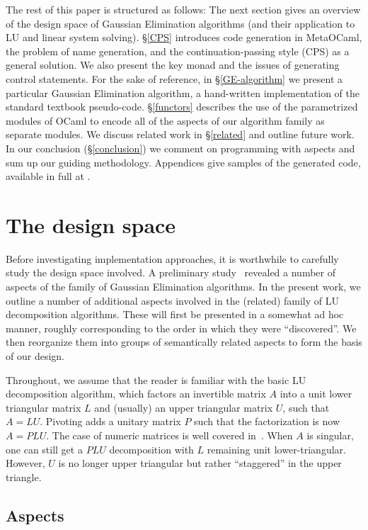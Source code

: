 \documentclass{elsart}
\begin{document}
The rest of this paper is structured as follows: The next section
gives an overview of the design space of Gaussian Elimination algorithms
(and their application to LU and linear system solving).
\S\ref{CPS}
introduces code generation in MetaOCaml, the problem of name
generation, and the continuation-passing style (CPS) as a general
solution.  We also present the key monad and the issues of generating
control statements. For the sake of reference, in \S\ref{GE-algorithm} 
we present a particular Gaussian Elimination algorithm,
a hand-written implementation of the standard textbook pseudo-code.
\S\ref{functors} describes the use of
the parametrized modules of OCaml to encode all of the aspects of our
algorithm family as separate modules.  We discuss related work in
\S\ref{related} and outline future work. In our
conclusion (\S\ref{conclusion}) we comment
on programming with aspects and sum up our guiding methodology.
Appendices give samples of the generated code, available in
full at \cite{metamonadsURL}.

\section{The design space}\label{design}

Before investigating implementation approaches, it is worthwhile to
carefully study the design space involved.  A preliminary
study~\cite{Carette06} revealed a number of aspects of the family of
Gaussian Elimination algorithms.  In the present work, we outline a
number of additional aspects involved in the (related) family of LU
decomposition algorithms.  These will first be presented in a somewhat
ad hoc manner, roughly corresponding to the order in which they were
``discovered''.  We then reorganize them into groups of
semantically related aspects to form the basis of our design.

Throughout, we assume that the reader is familiar with the basic LU
decomposition algorithm, which factors an invertible matrix $A$ into a unit
lower triangular matrix $L$ and (usually) an upper triangular matrix $U$,
such that $A = LU$.  Pivoting adds a unitary matrix $P$ such
that the factorization is now $A = PLU$.  The case of numeric matrices is well
covered in~\cite{Golub-vanLoan}.  When $A$ is singular, one can still get
a $PLU$ decomposition with $L$ remaining unit lower-triangular. However, 
$U$ is no longer upper triangular but rather ``staggered''
in the upper triangle.

\subsection{Aspects}\label{sec:aspects}
\end{document}

